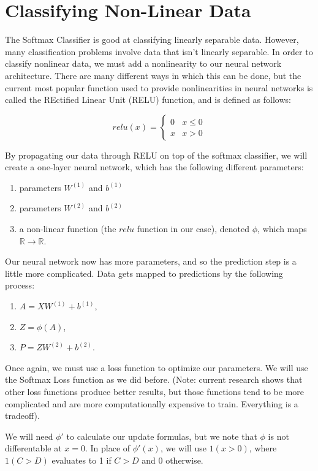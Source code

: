\newpage
\section{Classifying Non-Linear Data}
The Softmax Classifier is good at classifying linearly separable data.
However, many classification problems involve data that isn't linearly
separable. In order to classify nonlinear data, we must add a nonlinearity to
our neural network architecture. There are many different ways in which this
can be done, but the current most popular function used to provide
nonlinearities in neural networks is called the REctified Linear Unit (RELU)
function, and is defined as follows:

\[ relu(x) = \begin{cases} 
      0 & x\leq 0 \\
      x & x > 0 
   \end{cases}
\]

By propagating our data through RELU on top of the softmax classifier, we will
create a one-layer neural network, which has the following different
parameters:
\begin{enumerate}
\item parameters $W^{(1)}$ and $b^{(1)}$
\item parameters $W^{(2)}$ and $b^{(2)}$ \item a non-linear function (the
$relu$ function in our case), denoted $\phi$, which maps $\mathbb{R}
\longrightarrow \mathbb{R}$.
\end{enumerate}

Our neural network now has more parameters, and so the prediction step is a
little more complicated. Data gets mapped to predictions by the following
process:
\begin{enumerate}
\item $A = XW^{(1)} + b^{(1)}$,
\item $Z = \phi(A)$,
\item $P = ZW^{(2)} + b^{(2)}$.
\end{enumerate}

Once again, we must use a loss function to optimize our parameters. We will use
the Softmax Loss function as we did before. (Note: current research shows that
other loss functions produce better results, but those functions tend to be
more complicated and are more computationally expensive to train. Everything is
a tradeoff).

We will need $\phi'$ to calculate our update formulas, but we note that
$\phi$ is not differentable at $x=0$. In place of $\phi'(x)$, we will use
$1(x > 0)$, where $1(C > D)$ evaluates to 1 if $C > D$ and 0 otherwise.

